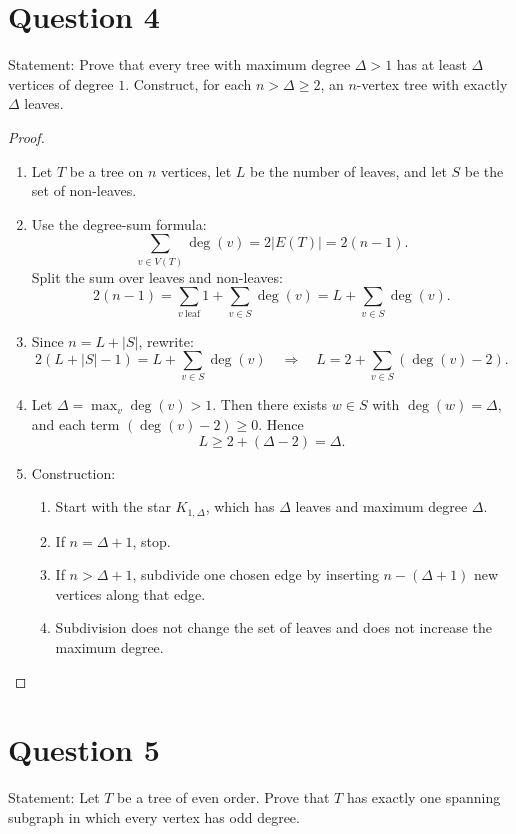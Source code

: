 \documentclass[11pt]{article}
\begin{document}
\newpage

\section*{Question 4}
Statement: Prove that every tree with maximum degree $\Delta>1$ has at least $\Delta$ vertices of degree $1$. Construct, for each $n>\Delta\ge 2$, an $n$-vertex tree with exactly $\Delta$ leaves.

\begin{proof}
~
\begin{enumerate}
\item Let $T$ be a tree on $n$ vertices, let $L$ be the number of leaves, and let $S$ be the set of non-leaves.
\item Use the degree-sum formula:
\[
\sum_{v\in V(T)}\deg(v)=2|E(T)|=2(n-1).
\]
Split the sum over leaves and non-leaves:
\[
2(n-1)=\sum_{v\ \text{leaf}}1+\sum_{v\in S}\deg(v)=L+\sum_{v\in S}\deg(v).
\]
\item Since $n=L+|S|$, rewrite:
\[
2(L+|S|-1)=L+\sum_{v\in S}\deg(v)
\quad\Longrightarrow\quad
L=2+\sum_{v\in S}(\deg(v)-2).
\]
\item Let $\Delta=\max_{v}\deg(v)>1$. Then there exists $w\in S$ with $\deg(w)=\Delta$, and each term $(\deg(v)-2)\ge 0$.
Hence
\[
L \ge 2+(\Delta-2)=\Delta.
\]
\item Construction:
\begin{enumerate}
\item Start with the star $K_{1,\Delta}$, which has $\Delta$ leaves and maximum degree $\Delta$.
\item If $n=\Delta+1$, stop.
\item If $n>\Delta+1$, subdivide one chosen edge by inserting $n-(\Delta+1)$ new vertices along that edge.
\item Subdivision does not change the set of leaves and does not increase the maximum degree.
\end{enumerate}
\end{enumerate}
\end{proof}

\newpage

\section*{Question 5}
Statement: Let $T$ be a tree of even order. Prove that $T$ has exactly one spanning subgraph in which every vertex has odd degree.
\end{document}
